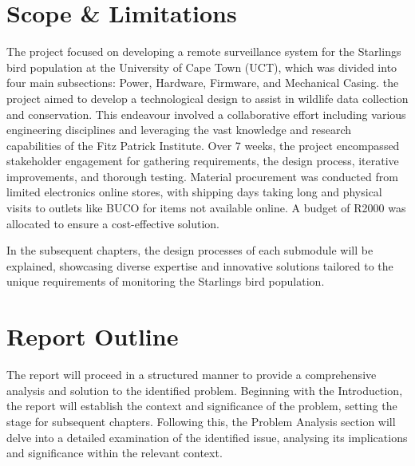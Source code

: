 \documentclass[class=report,11pt,crop=false]{standalone}
\begin{document}




\section{Scope \& Limitations}
The project focused on developing a remote surveillance system for the Starlings bird population at the University of Cape Town (UCT), which was divided into four main subsections: Power, Hardware, Firmware, and Mechanical Casing. the project aimed to develop a technological design to assist in wildlife data collection and conservation. This endeavour involved a collaborative effort including various engineering disciplines and leveraging the vast knowledge and research capabilities of the Fitz Patrick Institute.
\newline
Over 7 weeks, the project encompassed stakeholder engagement for gathering requirements, the design process, iterative improvements, and thorough testing. Material procurement was conducted from limited electronics online stores, with shipping days taking long and physical visits to outlets like BUCO for items not available online. A budget of R2000 was allocated to ensure a cost-effective solution.
\newline

In the subsequent chapters, the design processes of each submodule will be explained, showcasing diverse expertise and innovative solutions tailored to the unique requirements of monitoring the Starlings bird population. 

\section{Report Outline}
The report will proceed in a structured manner to provide a comprehensive analysis and solution to the identified problem. Beginning with the Introduction, the report will establish the context and significance of the problem, setting the stage for subsequent chapters. Following this, the Problem Analysis section will delve into a detailed examination of the identified issue, analysing its implications and significance within the relevant context.
\newline
\end{document}
